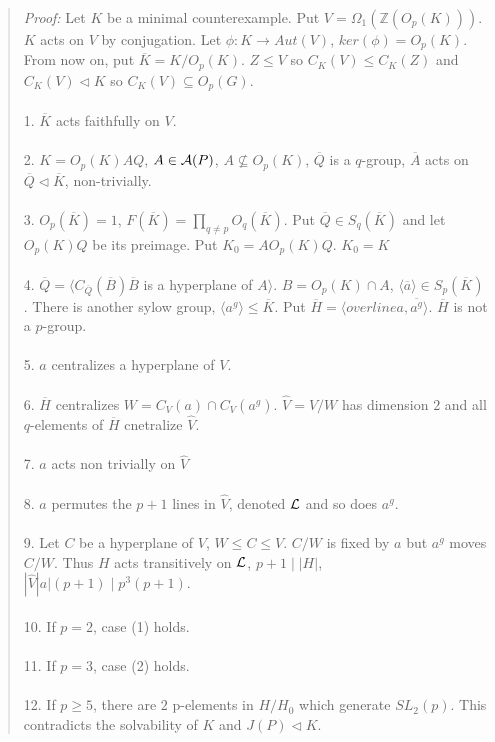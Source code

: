 \begin{quote}
\emph{Proof:}  Let $K$ be a minimal counterexample.  Put $V= \Omega_1({\mathbb Z}(O_p(K)))$. $K$ acts on $V$ by
conjugation. Let $\phi: K \rightarrow Aut(V)$, $ker(\phi) = O_p(K)$.  From now on, put ${\overline K} = K/O_p(K)$.
$Z \leq V$ so $C_K(V) \leq C_K(Z)$ and $C_K(V) \lhd K$ so $C_K(V) \subseteq O_p(G)$.
\\
\\
1. ${\overline K}$ acts faithfully on $V$.
\\
\\
2. $K= O_p(K) A Q$, $A \in {\cal A}(P)$, $A \nsubseteq O_p(K)$, ${\overline Q}$ is a $q$-group, ${\overline A}$ acts on
${\overline Q} \lhd {\overline K}$, non-trivially.
\\
\\
3. $O_p({\overline K}) = 1$, $F({\overline K})= \prod_{q \ne p} O_q({\overline K})$.  Put ${\overline Q} \in S_q({\overline K})$
and let $O_p(K) Q$ be its preimage.  Put $K_0 = A O_p(K)Q$.  $K_0=K$
\\
\\
4. ${\overline Q} = \langle C_{\overline Q}({\overline B}) {\overline B}$ is a hyperplane of $A \rangle$.
$B= O_p(K) \cap A$, $\langle {\overline a} \rangle \in S_p({\overline K})$.  There is another sylow group,
$\langle a^g \rangle \leq {\overline K}$.  Put ${\overline H}= \langle {overline a}, {\overline {a^g}} \rangle$. ${\overline H}$
is not a $p$-group.
\\
\\
5. $a$ centralizes a hyperplane of $V$.
\\
\\
6. ${\overline H}$ centralizes $W = C_V(a) \cap C_V(a^g)$.  ${\hat V} = V /W$ has dimension $2$ and all $q$-elements of
${\overline H}$ cnetralize ${\hat V}$.
\\
\\
7. $a$ acts non trivially on ${\hat V}$
\\
\\
8. $a$ permutes the $p+1$ lines in ${\hat V}$, denoted ${\cal L}$ and so does $a^g$.
\\
\\
9. Let $C$ be a hyperplane of $V$, $W \leq C \leq V$. $C/W$ is fixed by $a$ but $a^g$ moves $C/W$.  Thus $H$ acts transitively
on ${\cal L}$, $p+1 \mid |H|$, $|{\hat V} |a| (p+1) \mid p^3 (p+1)$.
\\
\\
10. If $p=2$, case (1) holds.
\\
\\
11. If $p=3$, case (2) holds.
\\
\\
12. If $p\geq 5$, 
there are $2$ p-elements in $H/H_0$ which generate $SL_2(p)$.
This contradicts the solvability of $K$ and $J(P) \lhd K$.


\end{quote}
